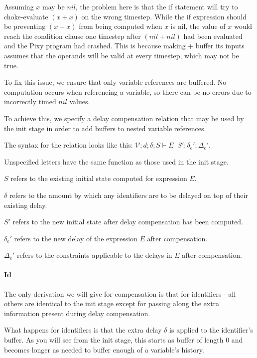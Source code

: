 \documentclass{scrartcl}
\DeclareMathOperator{\comprel}{\overset{compensate}{\Rightarrow}}
\begin{document}
    Assuming $x$ may be $nil$, the problem here is that the if statement will try to choke-evaluate $(x + x)$ on the wrong timestep. While the if expression should be preventing $(x+x)$ from being computed when $x$ is nil, the value of $x$ would reach the condition clause one timestep after $(nil+nil)$ had been evaluated and the Pixy program had crashed. This is because making + buffer its inputs assumes that the operands will be valid at every timestep, which may not be true.
    
    To fix this issue, we ensure that only variable references are buffered. No computation occurs when referencing a variable, so there can be no errors due to incorrectly timed $nil$ values.
    
    To achieve this, we specify a delay compensation relation that may be used by the init stage in order to add buffers to nested variable references.
    
    The syntax for the relation looks like this: $\mathcal{V}; d; \delta; S \vdash E \comprel S'; \delta_e'; \Delta_e'$.
    
    Unspecified letters have the same function as those used in the init stage.
    
    $S$ refers to the existing initial state computed for expression $E$.
    
    $\delta$ refers to the amount by which any identifiers are to be delayed on top of their existing delay.
    
    $S'$ refers to the new initial state after delay compensation has been computed.
    
    $\delta_e'$ refers to the new delay of the expression $E$ after compensation.
    
    $\Delta_e'$ refers to the constraints applicable to the delays in $E$ after compensation.
    
    \paragraph{Id}
    
    The only derivation we will give for compensation is that for identifiers - all others are identical to the init stage except for passing along the extra information present during delay compensation.
    
    What happens for identifiers is that the extra delay $\delta$ is applied to the identifier's buffer. As you will see from the init stage, this starts as buffer of length 0 and becomes longer as needed to buffer enough of a variable's history.
    
\end{document}
